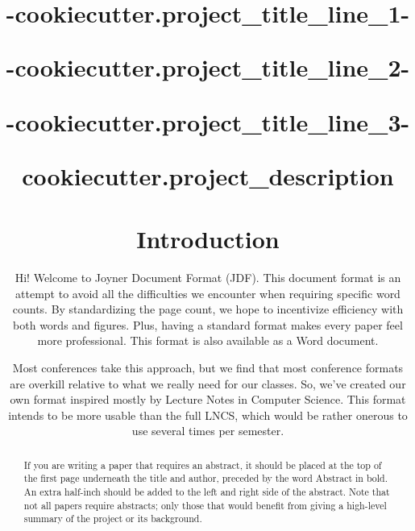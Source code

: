 

\title{
  {{-cookiecutter.project_title_line_1-}} \\

  {%
    {{-cookiecutter.project_title_line_2-}} \\
  {%

  {%
    {{-cookiecutter.project_title_line_3-}} \\
  {%
  }



\maketitle
\thispagestyle{fancy}

{{cookiecutter.project_description}}

% 

\begin{abstract}
If you are writing a paper that requires an abstract, it should be placed at the
top of the first page underneath the title and author, preceded by the word
Abstract in bold. An extra half-inch should be added to the left and right side
of the abstract. Note that not all papers require abstracts; only those that
would benefit from giving a high-level summary of the project or its background.
\end{abstract}

\section*{Introduction}
Hi! Welcome to Joyner Document Format (JDF). This document format is an attempt
to avoid all the difficulties we encounter when requiring specific word counts.
By standardizing the page count, we hope to incentivize efficiency with both
words and figures. Plus, having a standard format makes every paper feel more
professional. This format is also available as a Word document.

Most conferences take this approach, but we find that most conference formats
are overkill relative to what we really need for our classes. So, we've created
our own format inspired mostly by Lecture Notes in Computer Science. This format
intends to be more usable than the full LNCS, which would be rather onerous to
use several times per semester.


}}}}
